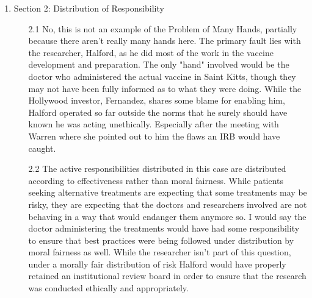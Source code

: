 \documentclass[12pt]{article}
\begin{document}
\begin{enumerate}
\begin{enumerate}
  \end{enumerate}

\item Section 2: Distribution of Responsibility

  \begin{enumerate}
    \item[2.1] No, this is not an example of the Problem of Many Hands, partially
        because there aren't really many hands here. The primary fault lies with
        the researcher, Halford, as he did most of the work in the vaccine development
        and preparation. The only "hand" involved would be the doctor who administered
        the actual vaccine in Saint Kitts, though they may not have been fully informed
        as to what they were doing. While the Hollywood investor, Fernandez, shares some
        blame for enabling him, Halford operated so far outside the norms that he
        surely should have known he was acting unethically. Especially after the meeting
        with Warren where she pointed out to him the flaws an IRB would have caught.
        
    \item[2.2] The active responsibilities distributed in this case are distributed 
        according to effectiveness rather than moral fairness. While patients seeking
        alternative treatments are expecting that some treatments may be risky, they are
        expecting that the doctors and researchers involved are not behaving in a way that
        would endanger them anymore so. I would say the doctor administering the treatments
        would have had some responsibility to ensure that best practices were being followed
        under distribution by moral fairness as well. While the researcher isn't part of this
        question, under a morally fair distribution of risk Halford would have properly
        retained an institutional review board in order to ensure that the research
        was conducted ethically and appropriately.
  \end{enumerate}

\end{enumerate}
\end{document}
